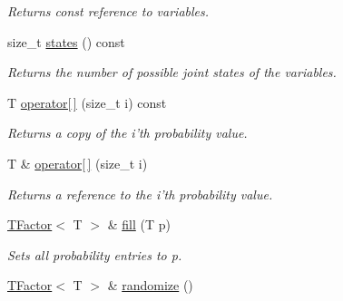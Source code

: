 \begin{CompactItemize}
\begin{CompactList}\small\item\em Returns const reference to variables. \item\end{CompactList}\item 
\hypertarget{classdai_1_1TFactor_57d676927a5dcacbef47f564c46bf128}{
size\_\-t \hyperlink{classdai_1_1TFactor_57d676927a5dcacbef47f564c46bf128}{states} () const }
\label{classdai_1_1TFactor_57d676927a5dcacbef47f564c46bf128}

\begin{CompactList}\small\item\em Returns the number of possible joint states of the variables. \item\end{CompactList}\item 
\hypertarget{classdai_1_1TFactor_22a12143c01d05a1e70ca3f92ec42595}{
T \hyperlink{classdai_1_1TFactor_22a12143c01d05a1e70ca3f92ec42595}{operator\mbox{[}$\,$\mbox{]}} (size\_\-t i) const }
\label{classdai_1_1TFactor_22a12143c01d05a1e70ca3f92ec42595}

\begin{CompactList}\small\item\em Returns a copy of the i'th probability value. \item\end{CompactList}\item 
\hypertarget{classdai_1_1TFactor_8be917166f0f32f2da09e09fc5fa2651}{
T \& \hyperlink{classdai_1_1TFactor_8be917166f0f32f2da09e09fc5fa2651}{operator\mbox{[}$\,$\mbox{]}} (size\_\-t i)}
\label{classdai_1_1TFactor_8be917166f0f32f2da09e09fc5fa2651}

\begin{CompactList}\small\item\em Returns a reference to the i'th probability value. \item\end{CompactList}\item 
\hypertarget{classdai_1_1TFactor_949ed2c4aefdf1aadfe33d0c2dac89b3}{
\hyperlink{classdai_1_1TFactor}{TFactor}$<$ T $>$ \& \hyperlink{classdai_1_1TFactor_949ed2c4aefdf1aadfe33d0c2dac89b3}{fill} (T p)}
\label{classdai_1_1TFactor_949ed2c4aefdf1aadfe33d0c2dac89b3}

\begin{CompactList}\small\item\em Sets all probability entries to p. \item\end{CompactList}\item 
\hypertarget{classdai_1_1TFactor_f52a4ee1544b4e628390918239b7bc1b}{
\hyperlink{classdai_1_1TFactor}{TFactor}$<$ T $>$ \& \hyperlink{classdai_1_1TFactor_f52a4ee1544b4e628390918239b7bc1b}{randomize} ()}
\label{classdai_1_1TFactor_f52a4ee1544b4e628390918239b7bc1b}


\end{CompactItemize}
